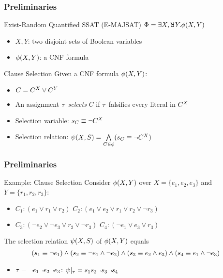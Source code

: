 \begin{frame}
  \frametitle{Preliminaries}
  \begin{block}{Exist-Random Quantified SSAT (E-MAJSAT)}
    $\Qf=\exists X,\random{} Y.\pf(X,Y)$
    \pause
    \begin{itemize}
      \item $X,Y$: two disjoint sets of Boolean variables
            \pause
      \item $\phi(X,Y)$: a CNF formula
            \pause
    \end{itemize}
  \end{block}
  \begin{block}{Clause Selection}
    Given a CNF formula $\phi(X,Y)$:
    \pause
    \begin{itemize}
      \item $C=C^X\lor C^Y$
            \pause
      \item An assignment $\tau$ \textit{selects} $C$ if $\tau$ falsifies every literal in $C^X$
            \pause
      \item Selection variable: $s_{C}\equiv\lnot C^X$
            \pause
      \item Selection relation: $\psi(X,S)=\bigwedge\limits_{C\in\phi}(s_{C}\equiv\lnot C^X)$
    \end{itemize}
  \end{block}
\end{frame}

\begin{frame}
  \frametitle{Preliminaries}
  \begin{block}{Example: Clause Selection}
    Consider $\phi(X,Y)$ over $X=\{e_1,e_2,e_3\}$ and $Y=\{r_1,r_2,r_3\}$:
    \begin{itemize}
      \item[] $C_1: (e_1 \lor r_1 \lor r_2)$ $C_2: (e_1 \lor e_2 \lor r_1 \lor r_2 \lor \lnot r_3)$
      \item[] $C_3: (\lnot e_2 \lor \lnot e_3 \lor r_2 \lor \lnot r_3)$ $C_4: (\lnot e_1 \lor e_3 \lor r_3)$
    \end{itemize}
    \pause
    The selection relation $\psi(X,S)$ of $\phi(X,Y)$ equals
    \belowdisplayskip=0pt
    \begin{align*}
      (s_{1} \equiv \lnot e_1) \land
      (s_{2} \equiv \lnot e_1 \land \lnot e_2) \land
      (s_{3} \equiv e_2 \land e_3) \land
      (s_{4} \equiv e_1 \land \lnot e_3)
    \end{align*}
    \pause
    \begin{itemize}
      \item $\tau=\lnot e_1 \lnot e_2 \lnot e_3$: $\psi|_{\tau}=s_1s_2\neg s_3 \neg s_4$
    \end{itemize}
  \end{block}
\end{frame}
